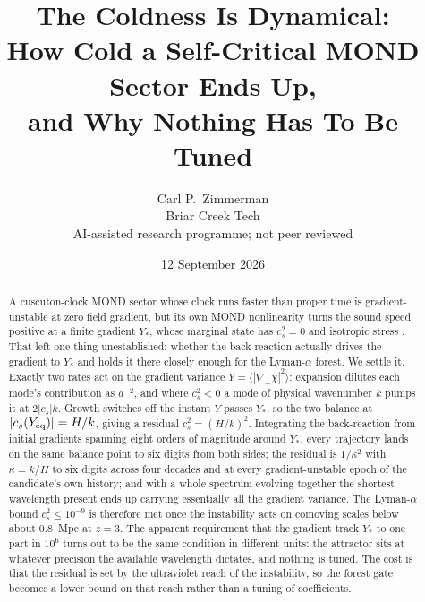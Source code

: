 \documentclass[11pt,letterpaper]{article}
\title{The Coldness Is Dynamical:\\ How Cold a Self-Critical MOND Sector Ends Up,\\ and Why Nothing Has To Be Tuned}
\author{Carl P.\ Zimmerman\\ \small Briar Creek Tech\\ \small AI-assisted research programme; not peer reviewed}
\date{12 September 2026}
\begin{document}
\maketitle
\begin{abstract}
A cuscuton-clock MOND sector whose clock runs faster than proper time is gradient-unstable at zero field gradient, but its own MOND nonlinearity turns the sound speed positive at a finite gradient $Y_*$, whose marginal state has $c_s^2=0$ and isotropic stress \cite{paper19}. That left one thing unestablished: whether the back-reaction actually drives the gradient to $Y_*$ and holds it there closely enough for the Lyman-$\alpha$ forest. We settle it. Exactly two rates act on the gradient variance $Y=\langle|\nabla_\perp\chi|^2\rangle$: expansion dilutes each mode's contribution as $a^{-2}$, and where $c_s^2<0$ a mode of physical wavenumber $k$ pumps it at $2|c_s|k$. Growth switches off the instant $Y$ passes $Y_*$, so the two balance at $|c_s(Y_{\rm eq})|=H/k$, giving a residual $c_s^2=(H/k)^2$. Integrating the back-reaction from initial gradients spanning eight orders of magnitude around $Y_*$, every trajectory lands on the same balance point to six digits from both sides; the residual is $1/\kappa^2$ with $\kappa=k/H$ to six digits across four decades and at every gradient-unstable epoch of the candidate's own history; and with a whole spectrum evolving together the shortest wavelength present ends up carrying essentially all the gradient variance. The Lyman-$\alpha$ bound $c_s^2\le10^{-9}$ is therefore met once the instability acts on comoving scales below about $0.8$~Mpc at $z=3$. The apparent requirement that the gradient track $Y_*$ to one part in $10^6$ turns out to be the same condition in different units: the attractor sits at whatever precision the available wavelength dictates, and nothing is tuned. The cost is that the residual is set by the ultraviolet reach of the instability, so the forest gate becomes a lower bound on that reach rather than a tuning of coefficients.
\end{abstract}
\end{document}
